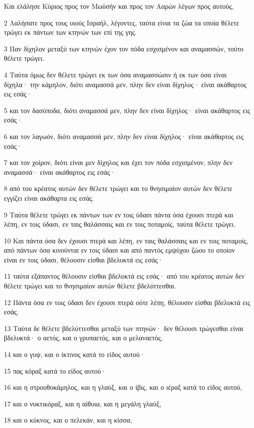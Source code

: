 \par Και ελάλησε Κύριος προς τον Μωϋσήν και προς τον Ααρών λέγων προς αυτούς,
\par 2 Λαλήσατε προς τους υιούς Ισραήλ, λέγοντες, ταύτα είναι τα ζώα τα οποία θέλετε τρώγει εκ πάντων των κτηνών των επί της γης.
\par 3 Παν δίχηλον μεταξύ των κτηνών έχον τον πόδα εσχισμένον και αναμασσών, τούτο θέλετε τρώγει.
\par 4 Ταύτα όμως δεν θέλετε τρώγει εκ των όσα αναμασσώσιν ή εκ των όσα είναι δίχηλα· την κάμηλον, διότι αναμασσά μεν, πλην δεν είναι δίχηλος· είναι ακάθαρτος εις εσάς·
\par 5 και τον δασύποδα, διότι αναμασσά μεν, πλην δεν είναι δίχηλος· είναι ακάθαρτος εις εσάς·
\par 6 και τον λαγωόν, διότι αναμασσά μεν, πλην δεν είναι δίχηλος· είναι ακάθαρτος εις εσάς·
\par 7 και τον χοίρον, διότι είναι μεν δίχηλος και έχει τον πόδα εσχισμένον, πλην δεν αναμασσά· είναι ακάθαρτος εις εσάς·
\par 8 από του κρέατος αυτών δεν θέλετε τρώγει και το θνησιμαίον αυτών δεν θέλετε εγγίζει είναι ακάθαρτα εις εσάς.
\par 9 Ταύτα θέλετε τρώγει εκ πάντων των εν τοις ύδασι πάντα όσα έχουσι πτερά και λέπη, εν τοις ύδασι, εν ταις θαλάσσαις και εν τοις ποταμοίς, ταύτα θέλετε τρώγει.
\par 10 Και πάντα όσα δεν έχουσι πτερά και λέπη, εν ταις θαλάσσαις και εν τοις ποταμοίς, από πάντων όσα κινούνται εν τοις ύδασι και από παντός εμψύχου ζώου το οποίον είναι εν τοις ύδασι, θέλουσιν είσθαι βδελυκτά εις εσάς·
\par 11 ταύτα εξάπαντος θέλουσιν είσθαι βδελυκτά εις εσάς· από του κρέατος αυτών δεν θέλετε τρώγει και το θνησιμαίον αυτών θέλετε βδελύττεσθαι.
\par 12 Πάντα όσα εν τοις ύδασι δεν έχουσι πτερά ούτε λέπη, θέλουσιν είσθαι βδελυκτά εις εσάς.
\par 13 Ταύτα δε θέλετε βδελύττεσθαι μεταξύ των πτηνών· δεν θέλουσι τρώγεσθαι είναι βδελυκτά· ο αετός, και ο γρυπαετός, και ο μελαναετός,
\par 14 και ο γυψ, και ο ίκτινος κατά το είδος αυτού·
\par 15 πας κόραξ κατά το είδος αυτού·
\par 16 και η στρουθοκάμηλος, και η γλαύξ, και ο ίβις, και ο ιέραξ κατά το είδος αυτού,
\par 17 και ο νυκτικόραξ, και η αίθυια, και η μεγάλη γλαύξ,
\par 18 και ο κύκνος, και ο πελεκάν, και η κίσσα,
